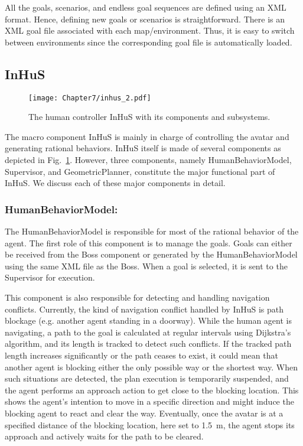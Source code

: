 All the goals, scenarios, and endless goal sequences are defined using an XML format. Hence, defining new goals or scenarios is straightforward. There is an XML goal file associated with each map/environment. Thus, it is easy to switch between environments since the corresponding goal file is automatically loaded.


\subsection{InHuS}

\begin{figure}[b]
    \centering
    \texttt{[image: Chapter7/inhus\_2.pdf]}
    \caption{
    The human controller InHuS with its components and subsystems. 
    }
    \label{fig:inhus_only}
    \vspace{-1cm}
\end{figure}

The macro component InHuS is mainly in charge of controlling the avatar and generating rational behaviors. InHuS itself is made of several components as depicted in Fig.~\ref{fig:inhus_only}. However, three components, namely HumanBehaviorModel, Supervisor, and GeometricPlanner, constitute the major functional part of InHuS. We discuss each of these major components in detail.


\subsubsection{HumanBehaviorModel:}

The HumanBehaviorModel is responsible for most of the rational behavior of the agent. The first role of this component is to manage the goals. Goals can either be received from the Boss component or generated by the HumanBehaviorModel using the same XML file as the Boss. When a goal is selected, it is sent to the Supervisor for execution. 

This component is also responsible for detecting and handling navigation conflicts. Currently, the kind of navigation conflict handled by InHuS is path blockage (e.g. another agent standing in a doorway). While the human agent is navigating, a path to the goal is calculated at regular intervals using Dijkstra's algorithm, and its length is tracked to detect such conflicts. If the tracked path length increases significantly or the path ceases to exist, it could mean that another agent is blocking either the only possible way or the shortest way. When such situations are detected, the plan execution is temporarily suspended, and the agent performs an approach action to get close to the blocking location. This shows the agent's intention to move in a specific direction and might induce the blocking agent to react and clear the way.
Eventually, once the avatar is at a specified distance of the blocking location, here set to \SI{1.5}{\metre}, the agent stops its approach and actively waits for the path to be cleared.

